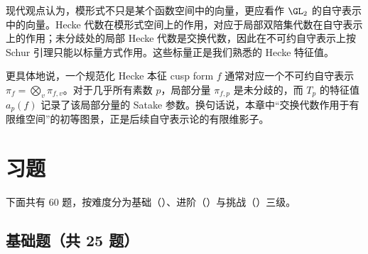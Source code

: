 \begin{remark}[与自守表示的联系：预告]
现代观点认为，模形式不只是某个函数空间中的向量，更应看作 $\GL_2$ 的自守表示中的向量。Hecke 代数在模形式空间上的作用，对应于局部双陪集代数在自守表示上的作用；未分歧处的局部 Hecke 代数是交换代数，因此在不可约自守表示上按 Schur 引理只能以标量方式作用。这些标量正是我们熟悉的 Hecke 特征值。

更具体地说，一个规范化 Hecke 本征 cusp form $f$ 通常对应一个不可约自守表示 $\pi_f=\bigotimes_v \pi_{f,v}$。对于几乎所有素数 $p$，局部分量 $\pi_{f,p}$ 是未分歧的，而 $T_p$ 的特征值 $a_p(f)$ 记录了该局部分量的 Satake 参数。换句话说，本章中“交换代数作用于有限维空间”的初等图景，正是后续自守表示论的有限维影子。
\end{remark}

\section*{习题}

下面共有 $60$ 题，按难度分为基础（\basic）、进阶（\medium）与挑战（\hard）三级。

\subsection*{基础题（共 25 题）}


